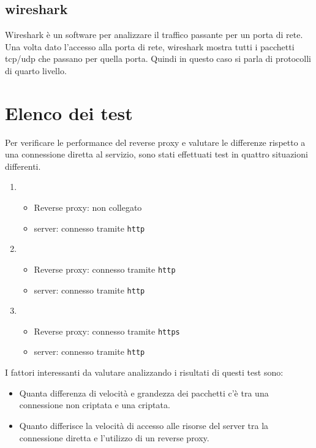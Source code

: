 \subsection{wireshark}
\cite{wireshark}
Wireshark è un software per analizzare il traffico passante per un porta di rete. Una volta dato l'accesso alla porta di rete, wireshark mostra tutti i pacchetti tcp/udp che passano per quella porta. Quindi in questo caso si parla di protocolli di quarto livello.

\section{Elenco dei test}\label{test:settings}
Per verificare le performance del reverse proxy e valutare le differenze rispetto a una connessione diretta al servizio, sono stati effettuati test in quattro situazioni differenti.
\begin{enumerate}
  \item
    \begin{itemize}
      \item Reverse proxy: non collegato
      \item server: connesso tramite \texttt{http}
    \end{itemize}
  \item
    \begin{itemize}
      \item Reverse proxy: connesso tramite \texttt{http}
      \item server: connesso tramite \texttt{http}
    \end{itemize}
  \item
    \begin{itemize}
      \item Reverse proxy: connesso tramite \texttt{https}
      \item server: connesso tramite \texttt{http}
    \end{itemize}
\end{enumerate}
I fattori interessanti da valutare analizzando i risultati di questi test sono:
\begin{itemize}
  \item Quanta differenza di velocità e grandezza dei pacchetti c'è tra una connessione non criptata e una criptata.
  \item Quanto differisce la velocità di accesso alle risorse del server tra la connessione diretta e l'utilizzo di un reverse proxy.
\end{itemize}

